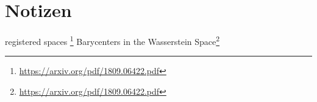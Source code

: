 \documentclass[twoside, 11pt,a4paper]{article}
\numberwithin{equation}{section}
\begin{document}
	
	\section{Notizen}
	registered spaces \footnote{\url{https://arxiv.org/pdf/1809.06422.pdf}}
	Barycenters in the Wasserstein Space\footnote{\url{https://arxiv.org/pdf/1809.06422.pdf}}
	\newpage
	
	\printglossaries
	
	\newpage
	
	
	
	
	
	
	
\end{document}
